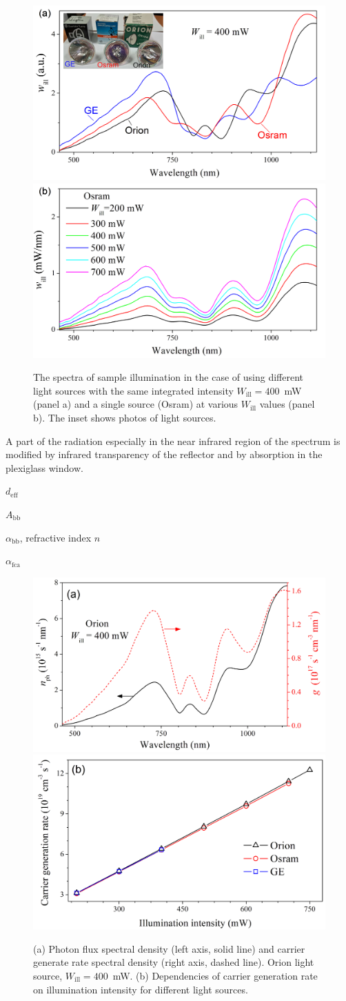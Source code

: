 \documentclass{WileyMSP-template}
\begin{document}
\begin{figure}
\centering
  \includegraphics[width=0.4\linewidth]{Fig4a.png}
  \includegraphics[width=0.4\linewidth]{Fig4b.png}
  \caption{
  The spectra of sample illumination in the case of using different light sources
  with the same integrated intensity $W_\mathrm{ill}=400$~mW (panel a) and a single source (Osram)
 at various $W_\mathrm{ill}$ values (panel b).
 The inset shows photos of light sources.
}
  \label{fig4}
\end{figure}

A part of the radiation especially in the near infrared region of the spectrum is modified by infrared transparency of the reflector and by absorption in
the plexiglass window. \cite{Libra2017}


$d_\mathrm{eff}$ \cite{Bowden2007}

$A_\mathrm{bb}$ \cite{Schaefer2018}

$\alpha_\mathrm{bb}$, refractive index $n$ \cite{Green2022}

$\alpha_\mathrm{fca}$ \cite{SiFCA}


\begin{figure}
\centering
  \includegraphics[width=0.4\linewidth]{Fig5a.png}
  \includegraphics[width=0.4\linewidth]{Fig5b.png}
  \caption{
  (a) Photon flux spectral density (left axis, solid line) and carrier generate rate spectral density (right axis, dashed line).
  Orion light source, $W_\mathrm{ill}=400$~mW.
  (b) Dependencies of carrier generation rate on illumination intensity for different light sources.
  }
  \label{fig5}
\end{figure}
\end{document}
